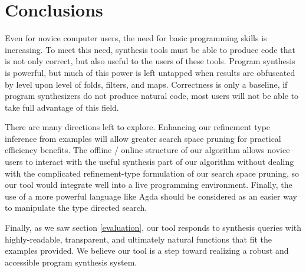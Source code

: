 \section{Conclusions}
\label{conclusions}
Even for novice computer users, the need for basic programming skills is increasing. To meet this need, synthesis tools must be able to produce code that is not only correct, but also useful to the users of these tools. Program synthesis is powerful, but much of this power is left untapped when results are obfuscated by level upon level of folds, filters, and maps. Correctness is only a baseline, if program synthesizers do not produce natural code, most users will not be able to take full advantage of this field.

There are many directions left to explore. Enhancing our refinement type inference from examples will allow greater search space pruning for practical efficiency benefits. The offline / online structure of our algorithm allows novice users to interact with the useful synthesis part of our algorithm without dealing with the complicated refinement-type formulation of our search space pruning, so our tool would integrate well into a live programming environment. Finally, the use of a more powerful language like Agda should be considered as an easier way to manipulate the type directed search.

Finally, as we saw section \ref{evaluation}, our tool responds to synthesis queries with highly-readable, transparent, and ultimately natural functions that fit the examples provided. We believe our tool is a step toward realizing a robust and accessible program synthesis system.
